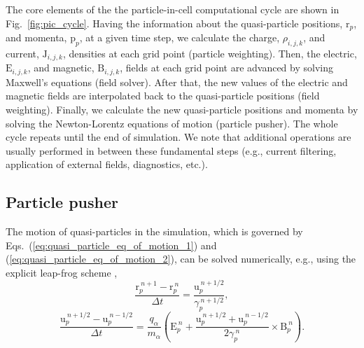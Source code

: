 \documentclass[10pt, a4paper, twoside, openright]{report}
\renewcommand{\vec}[1]{\boldsymbol{\mathrm{#1}}}
\begin{document}

The core elements of the the particle-in-cell computational cycle are shown in Fig.~\ref{fig:pic_cycle}. Having the information about the quasi-particle positions, $ \vec{r}_p $, and momenta, $ \vec{p}_p $, at a given time step, we calculate the charge, $ \rho_{i, j, k} $, and current, $ \vec{J}_{i, j, k} $, densities at each grid point (particle weighting). Then, the electric, $ \vec{E}_{i,j,k} $, and magnetic, $ \vec{B}_{i, j, k} $, fields at each grid point are advanced by solving Maxwell's equations (field solver). After that, the new values of the electric and magnetic fields are interpolated back to the quasi-particle positions (field weighting). Finally, we calculate the new quasi-particle positions and momenta by solving the Newton-Lorentz equations of motion (particle pusher). The whole cycle repeats until the end of simulation. We note that additional operations are usually performed in between these fundamental steps (e.g., current filtering, application of external fields, diagnostics, etc.).


\subsection{Particle pusher}

The motion of quasi-particles in the simulation, which is governed by Eqs.~(\ref{eq:quasi_particle_eq_of_motion_1}) and (\ref{eq:quasi_particle_eq_of_motion_2}), can be solved numerically, e.g., using the explicit leap-frog scheme \cite{Press2007},
\begin{equation}\label{eq:particle_pusher_eq_1}
	\frac{\vec{r}_{p}^{\:n+1} - \vec{r}_{p}^{\:n}}{\Delta t} = \frac{\vec{u}_{p}^{\:n + 1/2}}{\gamma_p^{\:n+1/2}},
\end{equation}
\begin{equation}\label{eq:particle_pusher_eq_2}
	\frac{\vec{u}_{p}^{\:n+1/2} - \vec{u}_{p}^{\:n-1/2}}{\Delta t} = \frac{q_{\alpha}}{m_{\alpha}} \left( \vec{E}_{p}^{\:n} + \frac{\vec{u}_{p}^{\:n+1/2} + \vec{u}_{p}^{\:n-1/2}}{2 \gamma_p^{\:n}} \times \vec{B}_{p}^{\:n} \right).
\end{equation}
\end{document}
